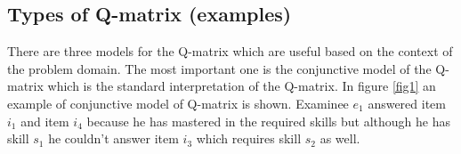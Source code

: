 



\subsection{Types of Q-matrix (examples) }

There are three models for the Q-matrix which are useful based on the context of the problem domain. The most important one is the conjunctive model of the Q-matrix which is the standard interpretation of the Q-matrix. In figure \ref{fig1} an example of conjunctive model of Q-matrix is shown. Examinee $e_{1}$ answered item $i_{1}$ and item $i_{4}$ because he has mastered in the required skills but although he has skill $s_{1}$ he couldn't answer item $i_{3}$ which requires skill $s_{2}$ as well.

